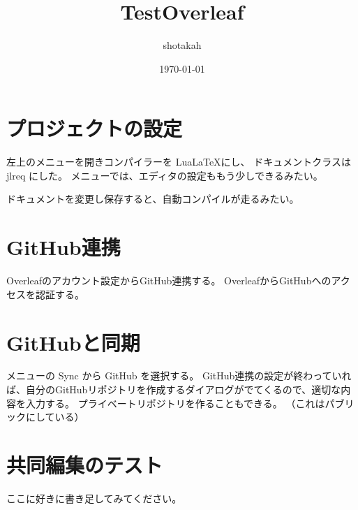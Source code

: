 \documentclass{jlreq}
\title{TestOverleaf}
\author{shotakah}
\date{\today}
\begin{document}
\maketitle

\section{プロジェクトの設定}

左上のメニューを開きコンパイラーを Lua\LaTeX にし、
ドキュメントクラスは jlreq にした。
メニューでは、エディタの設定ももう少しできるみたい。

ドキュメントを変更し保存すると、自動コンパイルが走るみたい。

\section{GitHub連携}

Overleafのアカウント設定からGitHub連携する。
OverleafからGitHubへのアクセスを認証する。

\section{GitHubと同期}

メニューの Sync から GitHub を選択する。
GitHub連携の設定が終わっていれば、自分のGitHubリポジトリを作成するダイアログがでてくるので、適切な内容を入力する。
プライベートリポジトリを作ることもできる。
（これはパブリックにしている）

\section{共同編集のテスト}

ここに好きに書き足してみてください。
\end{document}
